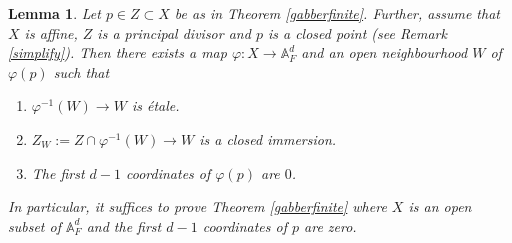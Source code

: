 \documentclass[10pt]{amsart}
\theoremstyle{plain}
\newtheorem{lemma}[thm]{Lemma}
\theoremstyle{definition}
\newcommand{\intersection}{\cap}
\newcommand{\A}{{\mathbb A}}
\begin{document}
\begin{lemma}\label{redopen} 
Let $p\in Z\subset X$ be as in Theorem \ref{gabberfinite}. Further, assume that $X$ is affine, $Z$ is a principal divisor and $p$ is a closed point (see Remark \ref{simplify}). Then there exists a map $\varphi:X\to \A^d_F$ and an open neighbourhood $W$ of $\varphi(p)$ such that 
\begin{enumerate}
\item $\varphi^{-1}(W) \to W$ is \'{e}tale. 
\item $Z_W:= Z\intersection \varphi^{-1}(W) \to W$ is a closed immersion. 
\item The first $d-1$ coordinates of $\varphi(p)$ are $0$. 
\end{enumerate}
In particular, it suffices to prove Theorem \ref{gabberfinite} where $X$ is an open subset of $\A^d_F$ and the first $d-1$ coordinates of $p$ are zero. 
\end{lemma}
\end{document}
